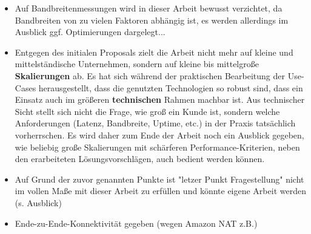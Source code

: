 \begin{itemize}
\item Auf Bandbreitenmessungen wird in dieser Arbeit bewusst verzichtet, da Bandbreiten von zu vielen Faktoren abhängig ist, es werden allerdings im Ausblick ggf. Optimierungen dargelegt...
\item Entgegen des initialen Proposals zielt die Arbeit nicht mehr auf kleine und mittelständische Unternehmen, sondern auf kleine bis mittelgroße \textbf{Skalierungen} ab. Es hat sich während der praktischen Bearbeitung der Use-Cases herausgestellt, dass die genutzten Technologien so robust sind, dass ein Einsatz auch im \glqq größeren \textbf{technischen} Rahmen\grqq{} machbar ist. Aus technischer Sicht stellt sich nicht die Frage, wie \glqq groß\grqq{} ein Kunde ist, sondern welche Anforderungen (Latenz, Bandbreite, Uptime, etc.) in der Praxis tatsächlich vorherrschen. Es wird daher zum Ende der Arbeit noch ein Ausblick gegeben, wie beliebig große Skalierungen mit schärferen Performance-Kriterien, neben den erarbeiteten Lösungsvorschlägen, auch bedient werden können.
\item Auf Grund der zuvor genannten Punkte ist "letzer Punkt Fragestellung" nicht im vollen Maße mit dieser Arbeit zu erfüllen und könnte eigene Arbeit werden (s. Ausblick)
\item Ende-zu-Ende-Konnektivität gegeben (wegen Amazon NAT z.B.)


\end{itemize}

\iffalse
Serifen Schrit für Programmnamen?
Teilweise gekürzt mit [...] oder Funktionsnamen der Einfachheit umbenannt oder vereinfacht dargestellt
Todo: RFC 5737 in Einleitung (Documentation IPs)
Getestet mit Terraform Version...
Abkürzungen AWS, VPC werden einmal erläutert, danach Schicht im Schacht
Rein technischer Natur, es wird nicht auf Kostenoptimierung eingangen -> dafür ist Cloud-Costs zu komplex
Abgrenzung: alle Public-IP und Private-IP beziehen sich auf IPv3!!!
Kommandos sind mit Dollar markiert. Sie werden genutzt, wenn ein Filterausdruck erkennbar sein soll, oftmals mit grep
Typische Schalter in dieser Arbeit:
-A n: Zeige auch die nächsten n Zeilen nach einem Treffer
-B n: Zeige auch die vorherigen n Zeilen vor einem Treffer
-o Zeige ausschließlich den Treffer, nicht die komplette Zeile, oftmals im Zusammenspiel mit -E
-E Suche mit Hilfe von regulären Ausdrücken (Regex)
-v ignoriere Zeilen, die das Pattern beinhalten (invertiere)
Linux-Grundlagen werden vorausgesetzt, iptables, cat, head, tail, 
Alle Zeichnungen wurden draw.io gemacht. Auch die Shapes entstammen draw.io
Monospace für Programmaufrufe
Unterstrichen für Dateinamen
Alle Codebeispiele finden sich im Github
\fi